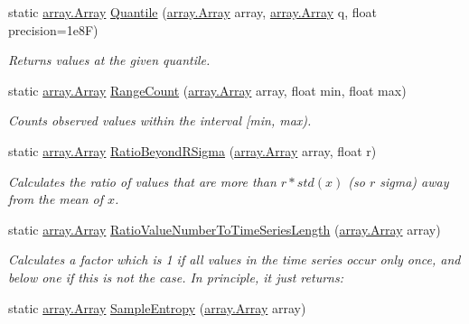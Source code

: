 \begin{DoxyCompactItemize}
static \mbox{\hyperlink{classkhiva_1_1array_1_1_array}{array.\+Array}} \mbox{\hyperlink{classkhiva_1_1features_1_1_features_a2fa1e072e11ee66d5a990e8693453baf}{Quantile}} (\mbox{\hyperlink{classkhiva_1_1array_1_1_array}{array.\+Array}} array, \mbox{\hyperlink{classkhiva_1_1array_1_1_array}{array.\+Array}} q, float precision=1e8\+F)
\begin{DoxyCompactList}\small\item\em Returns values at the given quantile. \end{DoxyCompactList}\item 
static \mbox{\hyperlink{classkhiva_1_1array_1_1_array}{array.\+Array}} \mbox{\hyperlink{classkhiva_1_1features_1_1_features_ac94058b3f4bc3b8e0e21be262b1b217a}{Range\+Count}} (\mbox{\hyperlink{classkhiva_1_1array_1_1_array}{array.\+Array}} array, float min, float max)
\begin{DoxyCompactList}\small\item\em Counts observed values within the interval \mbox{[}min, max). \end{DoxyCompactList}\item 
static \mbox{\hyperlink{classkhiva_1_1array_1_1_array}{array.\+Array}} \mbox{\hyperlink{classkhiva_1_1features_1_1_features_a7d4cb680ce6da51a624f3bb5d7ebfc7b}{Ratio\+Beyond\+R\+Sigma}} (\mbox{\hyperlink{classkhiva_1_1array_1_1_array}{array.\+Array}} array, float r)
\begin{DoxyCompactList}\small\item\em Calculates the ratio of values that are more than $r*std(x)$ (so $r$ sigma) away from the mean of $x$. \end{DoxyCompactList}\item 
static \mbox{\hyperlink{classkhiva_1_1array_1_1_array}{array.\+Array}} \mbox{\hyperlink{classkhiva_1_1features_1_1_features_a3d266e683f95b94a05b0846163ded46d}{Ratio\+Value\+Number\+To\+Time\+Series\+Length}} (\mbox{\hyperlink{classkhiva_1_1array_1_1_array}{array.\+Array}} array)
\begin{DoxyCompactList}\small\item\em Calculates a factor which is 1 if all values in the time series occur only once, and below one if this is not the case. In principle, it just returns\+: \end{DoxyCompactList}\item 
static \mbox{\hyperlink{classkhiva_1_1array_1_1_array}{array.\+Array}} \mbox{\hyperlink{classkhiva_1_1features_1_1_features_a64710838a714e6a1263bada2c04ad1a1}{Sample\+Entropy}} (\mbox{\hyperlink{classkhiva_1_1array_1_1_array}{array.\+Array}} array)

\end{DoxyCompactItemize}
